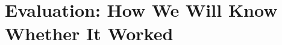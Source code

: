 \documentclass[11pt,letterpaper]{article}
\begin{document}


\section{Evaluation: How We Will Know Whether It Worked}\label{sec:eval}
\end{document}
